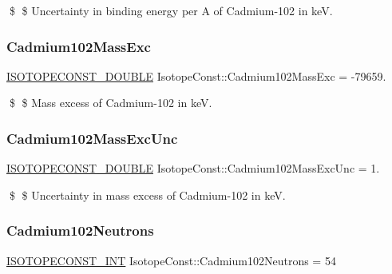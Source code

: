 \$ \$ Uncertainty in binding energy per A of Cadmium-\/102 in keV. \mbox{\label{group___isotope_const-_cadmium-_cd102_ga824af4a70076d8042b5928be8553f432}} 
\subsubsection{\texorpdfstring{Cadmium102\+Mass\+Exc}{Cadmium102MassExc}}
{\footnotesize\ttfamily \mbox{\hyperlink{group___isotope_const-_macros_ga8f45a7272ce02c0b4c65c44636ed719a}{I\+S\+O\+T\+O\+P\+E\+C\+O\+N\+S\+T\+\_\+\+D\+O\+U\+B\+LE}} Isotope\+Const\+::\+Cadmium102\+Mass\+Exc = -\/79659.}

\$ \$ Mass excess of Cadmium-\/102 in keV. \mbox{\label{group___isotope_const-_cadmium-_cd102_ga0b0c8330904284d3cbaa4e57b161d1e6}} 
\subsubsection{\texorpdfstring{Cadmium102\+Mass\+Exc\+Unc}{Cadmium102MassExcUnc}}
{\footnotesize\ttfamily \mbox{\hyperlink{group___isotope_const-_macros_ga8f45a7272ce02c0b4c65c44636ed719a}{I\+S\+O\+T\+O\+P\+E\+C\+O\+N\+S\+T\+\_\+\+D\+O\+U\+B\+LE}} Isotope\+Const\+::\+Cadmium102\+Mass\+Exc\+Unc = 1.}

\$ \$ Uncertainty in mass excess of Cadmium-\/102 in keV. \mbox{\label{group___isotope_const-_cadmium-_cd102_gaec4e9d204b10ede7ff4454101e4e629f}} 
\subsubsection{\texorpdfstring{Cadmium102\+Neutrons}{Cadmium102Neutrons}}
{\footnotesize\ttfamily \mbox{\hyperlink{group___isotope_const-_macros_ga5f18360b3e99483a35c32d789e62621c}{I\+S\+O\+T\+O\+P\+E\+C\+O\+N\+S\+T\+\_\+\+I\+NT}} Isotope\+Const\+::\+Cadmium102\+Neutrons = 54}

